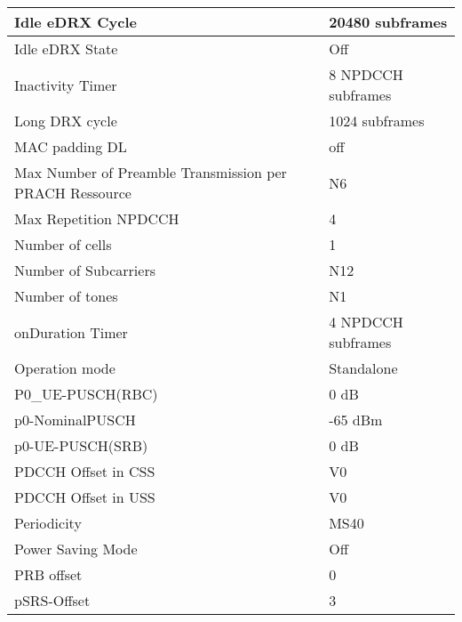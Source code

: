 \begin{longtable}{|p{8cm}|p{5cm}|}
Idle eDRX Cycle                                         & 20480 subframes    \\ \hline
Idle eDRX State                                         & Off                \\ \hline
Inactivity Timer                                        & 8 NPDCCH subframes \\ \hline
Long DRX cycle                                          & 1024 subframes     \\ \hline
MAC padding DL                                          & off                \\ \hline
Max Number of Preamble Transmission per PRACH Ressource & N6                 \\ \hline
Max Repetition NPDCCH                                   & 4                  \\ \hline
Number of cells                                         & 1                  \\ \hline
Number of Subcarriers                                   & N12                \\ \hline
Number of tones                                         & N1                 \\ \hline
onDuration Timer                                        & 4 NPDCCH subframes \\ \hline
Operation mode                                          & Standalone         \\ \hline
P0\_UE-PUSCH(RBC)                                       & 0 dB               \\ \hline
p0-NominalPUSCH                                         & -65 dBm            \\ \hline
p0-UE-PUSCH(SRB)                                        & 0 dB               \\ \hline
PDCCH Offset in CSS                                     & V0                 \\ \hline
PDCCH Offset in USS                                     & V0                 \\ \hline
Periodicity                                             & MS40               \\ \hline
Power Saving Mode                                       & Off                \\ \hline
PRB offset                                              & 0                  \\ \hline
pSRS-Offset                                             & 3                  \\ \hline

\end{longtable}
